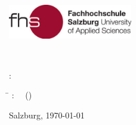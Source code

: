 \begin{titlepage}
\begin{center}
\Huge{
	{\textbf{\titlecap \ipapertype}}
}
\end{center}
\newpage

\thispagestyle{empty}

\hfill \includegraphics[height=1.5cm]{images/FHSLogo.pdf}

\vspace*{2cm}

\Large{
\MakeUppercase\ititle

\vspace*{1cm}

\MakeSentenceCase{\ipapertype}~\tattainment

\vspace*{0.5cm}

\textit{\tdegree}
}


\vspace*{1.5cm}
{\large
\tauthor: \iauthor
}
\vfill

{\normalsize
\tsubmitted

\vspace*{1cm}

\begin{tabbing}
\hspace*{1.4in}\=\kill
\texamined: \> \ \isupervisor~(\tsupervisor)
\end{tabbing}

\vfill
{}
Salzburg, \today
{}
}
\end{titlepage}